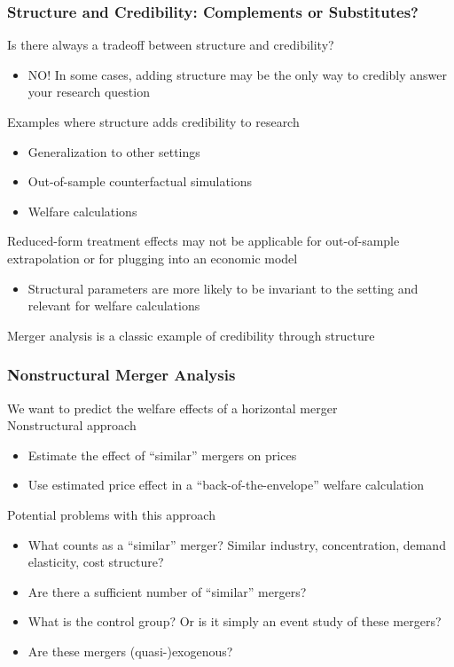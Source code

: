 \documentclass{beamer}
\begin{document}
\begin{frame}\frametitle{Structure and Credibility: Complements or Substitutes?}
    Is there always a tradeoff between structure and credibility?
    \begin{itemize}
    	\item NO! In some cases, adding structure may be the only way to credibly answer your research question
    \end{itemize}
    \vspace{2ex}
    Examples where structure adds credibility to research
    \begin{itemize}
    	\item Generalization to other settings
    	\item Out-of-sample counterfactual simulations
    	\item Welfare calculations
    \end{itemize}
    \vspace{2ex}
    Reduced-form treatment effects may not be applicable for out-of-sample extrapolation or for plugging into an economic model
    \begin{itemize}
     	\item Structural parameters are more likely to be invariant to the setting and relevant for welfare calculations
     \end{itemize} 
     \vspace{2ex}
     Merger analysis is a classic example of credibility through structure
\end{frame}

\begin{frame}\frametitle{Nonstructural Merger Analysis}
    We want to predict the welfare effects of a horizontal merger \\
    \vspace{2ex}
    Nonstructural approach
    \begin{itemize}
    	\item Estimate the effect of ``similar'' mergers on prices
    	\item Use estimated price effect in a ``back-of-the-envelope'' welfare calculation
    \end{itemize}
    \vspace{2ex}
    Potential problems with this approach
    \begin{itemize}
    	\item What counts as a ``similar'' merger? Similar industry, concentration, demand elasticity, cost structure?
    	\item Are there a sufficient number of ``similar'' mergers?
    	\item What is the control group? Or is it simply an event study of these mergers?
    	\item Are these mergers (quasi-)exogenous?
    \end{itemize}
\end{frame}
\end{document}
